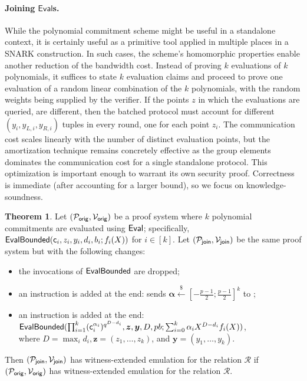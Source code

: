 \documentclass{article}
\theoremstyle{definition}
\newtheorem{theorem}{Theorem}
\begin{document}
\paragraph{Joining $\mathsf{Eval}$s.} While the polynomial commitment scheme might be useful in a standalone context, it is certainly useful as a primitive tool applied in multiple places in a SNARK construction. In such cases, the scheme's homomorphic properties enable another reduction of the bandwidth cost. Instead of proving $k$ evaluations of $k$ polynomials, it suffices to state $k$ evaluation claims and proceed to prove one evaluation of a random linear combination of the $k$ polynomials, with the random weights being supplied by the verifier. If the points $z$ in which the evaluations are queried, are different, then the batched protocol must account for different $(y_i, y_{L,i}, y_{R,i})$ tuples in every round, one for each point $z_i$. The communication cost scales linearly with the number of distinct evaluation points, but the amortization technique remains concretely effective as the group elements dominates the communication cost for a single standalone protocol. This optimization is important enough to warrant its own security proof. Correctness is immediate (after accounting for a larger bound), so we focus on knowledge-soundness.

\begin{theorem}
    Let $(\mathcal{P}_\mathsf{orig}, \mathcal{V}_\mathsf{orig})$ be a proof system where $k$ polynomial commitments are evaluated using $\textsf{{Eval}}$; specifically, $\textsf{{EvalBounded}}(\mathsf{c}_i, z_i, y_i, d_i, b_i; f_i(X))$ for $i \in [k]$. Let $(\mathcal{P}_\mathsf{join}, \mathcal{V}_\mathsf{join})$ be the same proof system but with the following changes: \begin{itemize} \itemsep0pt
        \item the invocations of $\textsf{{EvalBounded}}$ are dropped;
        \item an instruction is added at the end: \verifier sends $\boldsymbol{\alpha} \xleftarrow{\$} [-\frac{p-1}{2}; \frac{p-1}{2}]^k$ to \prover;
        \item an instruction is added at the end: \\
        $\textsf{{EvalBounded}}(\prod_{i=1}^k (\mathsf{c}_i^{\alpha_i})^{q^{D-d_i}}, \boldsymbol{z}, \boldsymbol{y}, D, pb; \sum_{i=0}^k \alpha_i X^{D-d_i} f_i(X))$, \\
        where $D = \max_i d_i, \boldsymbol{z} = (z_1, \ldots, z_k)$, and $\boldsymbol{y} = (y_1, \ldots, y_k)$.
    \end{itemize}
    Then $(\mathcal{P}_\mathsf{join}, \mathcal{V}_\mathsf{join})$ has witness-extended emulation for the relation $\mathcal{R}$ if $(\mathcal{P}_\mathsf{orig}, \mathcal{V}_\mathsf{orig})$ has witness-extended emulation for the relation $\mathcal{R}$.
\end{theorem}
\end{document}
